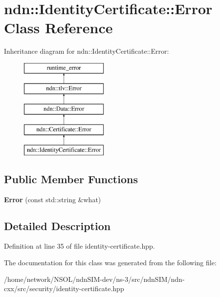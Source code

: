 \hypertarget{classndn_1_1IdentityCertificate_1_1Error}{}\section{ndn\+:\+:Identity\+Certificate\+:\+:Error Class Reference}
\label{classndn_1_1IdentityCertificate_1_1Error}
Inheritance diagram for ndn\+:\+:Identity\+Certificate\+:\+:Error\+:\begin{figure}[H]
\begin{center}
\leavevmode
\includegraphics[height=5.000000cm]{classndn_1_1IdentityCertificate_1_1Error}
\end{center}
\end{figure}
\subsection*{Public Member Functions}
\begin{DoxyCompactItemize}
\item 
{\bfseries Error} (const std\+::string \&what)\hypertarget{classndn_1_1IdentityCertificate_1_1Error_a527389ca57ba96f5a979ff06c79151c3}{}\label{classndn_1_1IdentityCertificate_1_1Error_a527389ca57ba96f5a979ff06c79151c3}

\end{DoxyCompactItemize}


\subsection{Detailed Description}


Definition at line 35 of file identity-\/certificate.\+hpp.



The documentation for this class was generated from the following file\+:\begin{DoxyCompactItemize}
\item 
/home/network/\+N\+S\+O\+L/ndn\+S\+I\+M-\/dev/ns-\/3/src/ndn\+S\+I\+M/ndn-\/cxx/src/security/identity-\/certificate.\+hpp\end{DoxyCompactItemize}
